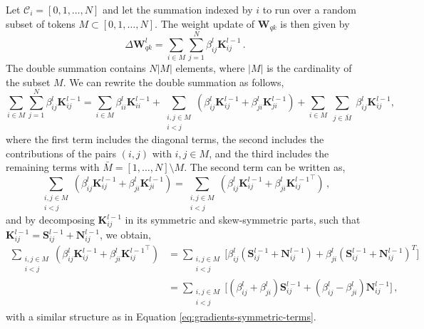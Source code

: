 %
\begin{remark}
%
Let $\mathcal{C}_i = [0,1,\dots, N]$ and let the summation indexed by $i$ to run over a random subset of tokens $ M \subset [0,1,\dots, N]$.
%
The weight update of $\bm{W}_{qk}$ is then given by
%
\begin{equation}
    \Delta \bm{W}_{qk}^l = \sum_{i\in M} \sum_{j=1}^N \beta^l_{ij} \bm{K}^{l-1}_{ij} \,.
\end{equation}
%
The double summation contains $N|M|$ elements, where $|M|$ is the cardinality of the subset $M$. 
%
We can rewrite the double summation as follows,
%
\begin{equation}
\label{eq:factorization-summation}
\sum_{i \in M} \sum_{j =1}^N \beta^l_{ij} \bm{K}^{l-1}_{ij} =
\sum_{i \in M} \beta^l_{ii} \bm{K}^{l-1}_{ii} +
\sum_{\substack{i,j \in M \\ i < j}} (\beta^l_{ij} \bm{K}^{l-1}_{ij} + \beta^l_{ji} \bm{K}^{l-1}_{ji}) +
\sum_{i \in M} \sum_{\substack{j \in \bar{M}}} \beta^l_{ij} \bm{K}^{l-1}_{ij},
\end{equation}
%
where the first term includes the diagonal terms, the second includes the contributions of the pairs $(i,j)$ with $i,j \in M$, and the third includes the remaining terms with $\bar{M} = [1,\dots,N] \setminus M$.
%
The second term can be written as,
%
\begin{equation}
 \sum_{\substack{i,j \in M \\ i < j}} (\beta^l_{ij} \bm{K}^{l-1}_{ij} + \beta^l_{ji} \bm{K}^{l-1}_{ji}) = \sum_{\substack{i,j \in M \\ i < j}} (\beta^l_{ij} \bm{K}^{l-1}_{ij} + \beta^l_{ji} {\bm{K}^{l-1}_{ij}}^\top) \,, 
\end{equation}
%
and by decomposing $\bm{K}^{l-1}_{ij}$ in its symmetric and skew-symmetric parts, such that $\bm{K}^{l-1}_{ij} = \bm{S}^{l-1}_{ij} + \bm{N}^{l-1}_{ij}$, we obtain,
%
\begin{equation}
\begin{split}
    \sum_{\substack{i,j \in M \\ i < j}} (\beta^l_{ij} \bm{K}^{l-1}_{ij} + \beta^l_{ji} {\bm{K}^{l-1}_{ij}}^\top)
    & = \sum_{\substack{i,j \in M \\ i < j}} \big[ \beta_{ij}^l(\bm{S}^{l-1}_{ij} + \bm{N}^{l-1}_{ij}) + \beta_{ji}^l(\bm{S}^{l-1}_{ij} + \bm{N}^{l-1}_{ij})^T \big] \\
    & = \sum_{\substack{i,j \in M \\ i < j}} \big[(\beta^l_{ij} + \beta^l_{ji})\bm{S}^{l-1}_{ij} + (\beta^l_{ij} - \beta^l_{ji})\bm{N}^{l-1}_{ij}\big]\,,
\end{split}
\end{equation}
%
with a similar structure as in Equation \eqref{eq:gradients-symmetric-terms}.
%
\end{remark}